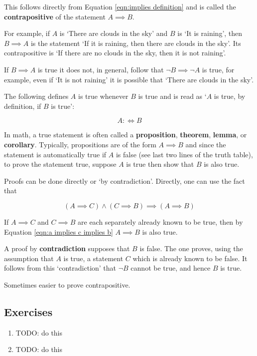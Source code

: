 \noindent This follows directly from Equation \ref{eqn:implies definition} and is called the \textbf{contrapositive} of the statement $A \implies B$.

For example, if $A$ is `There are clouds in the sky' and $B$ is `It is raining', then $B \implies A$ is the statement `If it is raining, then there are clouds in the sky'. Its contrapositive is `If there are no clouds in the sky, then it is not raining'.

If $B \implies A$ is true it does not, in general, follow that $\neg B \implies \neg A$ is true, for example, even if `It is not raining' it is possible that `There are clouds in the sky'.

The following defines $A$ is true whenever $B$ is true and is read as `$A$ is true, by definition, if $B$ is true':

$$
A :\iff B
$$

\medskip

In math, a true statement is often called a \textbf{proposition}, \textbf{theorem}, \textbf{lemma}, or \textbf{corollary}. Typically, propositions are of the form $A \implies B$ and since the statement is automatically true if $A$ is false (see last two lines of the truth table), to prove the statement true, suppose $A$ is true then show that $B$ is also true.

Proofs can be done directly or `by contradiction'. Directly, one can use the fact that 

\begin{equation} \label{eqn:a implies c implies b}
    (A \implies C) \land (C \implies B) \implies (A \implies B)
\end{equation}

If $A \implies C$ and $C \implies B$ are each separately already known to be true, then by Equation \ref{eqn:a implies c implies b} $A \implies B$ is also true. 

A proof by \textbf{contradiction} supposes that $B$ is false. The one proves, using the assumption that $A$ is true, a statement $C$ which is already known to be false. It follows from this `contradiction' that $\neg B$ cannot be true, and hence $B$ is true.

Sometimes easier to prove contrapositive.

\subsection*{Exercises}

\begin{enumerate}
    \item TODO: do this
    \item TODO: do this
\end{enumerate}